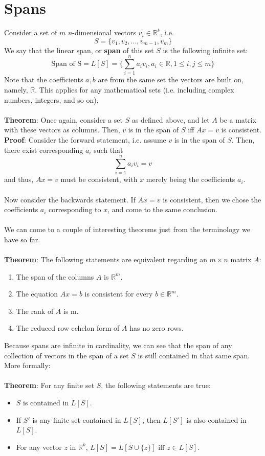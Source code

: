 \documentclass[11pt]{report}
\newcommand{\R}{\mathbb{R}}
\begin{document}
\section{Spans}
Consider a set of $m$ $n$-dimensional vectors $v_i \in \R^k$, i.e.
$$S = \{v_1, v_2, ..., v_{m-1}, v_m\}$$
We say that the linear span, or \textbf{span} of this set $S$ is the following infinite set:
$$\text{Span of S} = L[S] = \{\sum_{i=1}^{n} a_iv_i, a_i \in \R, 1 \le i,j \le m\}$$
Note that the coefficients $a,b$ are from the same set the vectors are built on, namely, $\R$. This applies for any mathematical sets (i.e. including complex numbers, integers, and so on).
\\ \\
\textbf{Theorem}: Once again, consider a set $S$ as defined above, and let $A$ be a matrix with these vectors as columns. Then, $v$ is in the span of $S$ iff $Ax = v$ is consistent.
\textbf{Proof}: Consider the forward statement, i.e. assume $v$ is in the span of $S$. Then, there exist corresponding $a_i$ such that
$$\sum_{i=1}^{n} a_iv_i = v$$
and thus, $Ax = v$ must be consistent, with $x$ merely being the coefficients $a_i$.
\\ \\
Now consider the backwards statement. If $Ax = v$ is consistent, then we chose the coefficients $a_i$ corresponding to $x$, and come to the same conclusion.
\\ \\
We can come to a couple of interesting theorems just from the terminology we have so far. 
\\ \\
\textbf{Theorem}: The following statements are equivalent regarding an $m \times n$ matrix $A$:
\begin{enumerate}
\item The span of the columns $A$ is $\R^m$.
\item The equation $Ax = b$ is consistent for every $b \in \R^m$.
\item The rank of $A$ is m.
\item The reduced row echelon form of $A$ has no zero rows.
\end{enumerate}
Because spans are infinite in cardinality, we can see that the span of any collection of vectors in the span of a set $S$ is still contained in that same span. More formally: \\ \\
\textbf{Theorem}: For any finite set $S$, the following statements are true:
\begin{itemize}
\item $S$ is contained in $L[S]$.
\item If $S'$ is any finite set contained in $L[S]$, then $L[S']$ is also contained in $L[S]$.
\item For any vector $z$ in $\R^k$, $L[S] = L[S \cup \{z\}]$ iff $z \in L[S]$.
\end{itemize}
\end{document}

